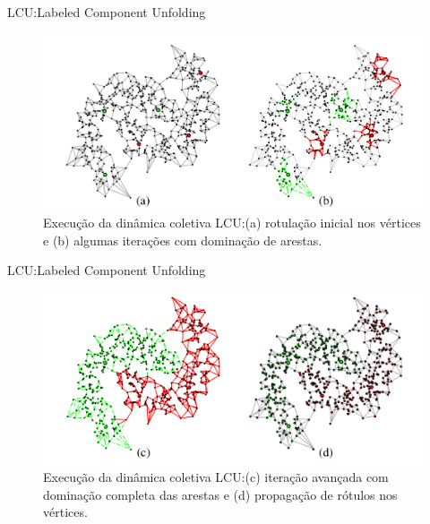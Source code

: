 \documentclass{templatebeamerufc/libs/ufc_format}
\begin{document}
\begin{frame}{LCU:\@ Labeled Component Unfolding}
  \begin{figure}[h!]\label{fig:lcu-classification-splig1}
    \centering
    \caption{
      Execução da dinâmica coletiva LCU:\@ (a) rotulação inicial nos
vértices e (b) algumas iterações com dominação de arestas.
    }
    \includegraphics[scale=0.43]{figuras/lcu-classification-split1}
  \end{figure}
  \vspace{1cm}
\end{frame}

\begin{frame}{LCU:\@ Labeled Component Unfolding}
  \begin{figure}[h!]\label{fig:lcu-classification-split2}
    \centering
    \caption{
      Execução da dinâmica coletiva LCU:\@ (c) iteração avançada com
dominação completa das arestas e (d) propagação de rótulos nos vértices.
    }
    \includegraphics[scale=0.43]{figuras/lcu-classification-split2}
  \end{figure}

\end{frame}
\end{document}
